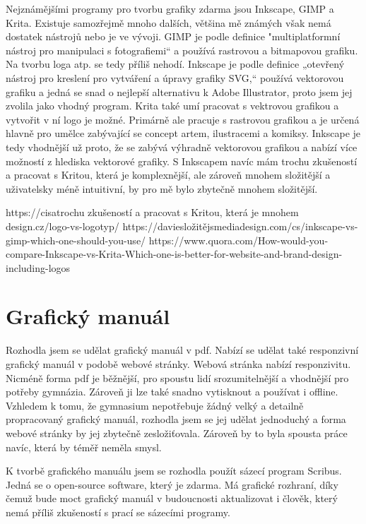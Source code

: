 \documentclass[11pt,a4paper,twoside,openright]{report}
\begin{document}
Nejznámějšími programy pro tvorbu grafiky zdarma jsou Inkscape, GIMP a Krita. Existuje samozřejmě mnoho dalších, většina mě známých však nemá dostatek nástrojů nebo je ve vývoji.
GIMP je podle definice "multiplatformní nástroj pro manipulaci s fotografiemi“ a používá rastrovou a bitmapovou grafiku. Na tvorbu loga atp. se tedy příliš nehodí.
Inkscape je podle definice „otevřený nástroj pro kreslení pro vytváření a úpravy grafiky SVG,“ používá vektorovou grafiku a jedná se snad o nejlepší alternativu k Adobe Illustrator, proto jsem jej zvolila jako vhodný program.
Krita také umí pracovat s vektrovou grafikou a vytvořit v ní logo je možné. Primárně ale pracuje s rastrovou grafikou a je určená hlavně pro umělce zabývající se concept artem, ilustracemi a komiksy. Inkscape je tedy vhodnější už proto, že se zabývá výhradně vektorovou grafikou a nabízí více možností z hlediska vektorové grafiky. S Inkscapem navíc mám trochu zkušeností a pracovat s Kritou, která je komplexnější, ale zároveň mnohem složitější a uživatelsky méně intuitivní, by pro mě bylo zbytečně mnohem složitější.


https://cisatrochu zkušeností a pracovat s Kritou, která je mnohem design.cz/logo-vs-logotyp/
https://daviesložitějsmediadesign.com/cs/inkscape-vs-gimp-which-one-should-you-use/
https://www.quora.com/How-would-you-compare-Inkscape-vs-Krita-Which-one-is-better-for-website-and-brand-design-including-logos

\section{Grafický manuál}
Rozhodla jsem se udělat grafický manuál v pdf. Nabízí se udělat také responzivní grafický manuál v podobě webové stránky. Webová stránka nabízí responzivitu. Nicméně forma pdf je běžnější, pro spoustu lidí srozumitelnější a vhodnější pro potřeby gymnázia. Zároveň ji lze také snadno vytisknout a používat i offline. Vzhledem k tomu, že gymnasium nepotřebuje žádný velký a detailně propracovaný grafický manuál, rozhodla jsem se jej udělat jednoduchý a forma webové stránky by jej zbytečně zesložiťovala. Zároveň by to byla spousta práce navíc, která by téměř neměla smysl.

\label{sec:manual}
K tvorbě grafického manuálu jsem se rozhodla použít sázecí program Scribus. Jedná se o open-source software, který je zdarma. Má grafické rozhraní, díky čemuž bude moct grafický manuál v budoucnosti aktualizovat i člověk, který nemá příliš zkušeností s prací se sázecími programy.
\end{document}
